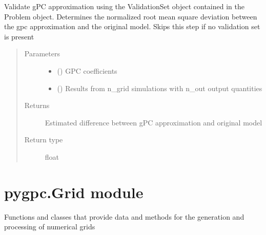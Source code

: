\documentclass[letterpaper,10pt,english,openany,oneside]{sphinxmanual}
\begin{document}
\begin{fulllineitems}
\begin{fulllineitems}
\label{\detokenize{pygpc:pygpc.GPC.GPC.validate}}
Validate gPC approximation using the ValidationSet object contained in the Problem object.
Determines the normalized root mean square deviation between the gpc approximation and the
original model. Skips this step if no validation set is present
\begin{quote}\begin{description}
\item[{Parameters}] \leavevmode\begin{itemize}
\item {} 
 (\sphinxstyleliteralemphasis{\sphinxupquote{ {[}}}\sphinxstyleliteralemphasis{\sphinxupquote{{]}}}) \textendash{} GPC coefficients

\item {} 
 (\sphinxstyleliteralemphasis{\sphinxupquote{ {[}}}\sphinxstyleliteralemphasis{\sphinxupquote{{]}}}) \textendash{} Results from n\_grid simulations with n\_out output quantities

\end{itemize}

\item[{Returns}] \leavevmode
{} \textendash{} Estimated difference between gPC approximation and original model

\item[{Return type}] \leavevmode
float

\end{description}\end{quote}

\end{fulllineitems}


\end{fulllineitems}



\section{pygpc.Grid module}
\label{\detokenize{pygpc:module-pygpc.Grid}}\label{\detokenize{pygpc:pygpc-grid-module}}
Functions and classes that provide data and methods for the generation and processing of numerical grids
\end{document}
